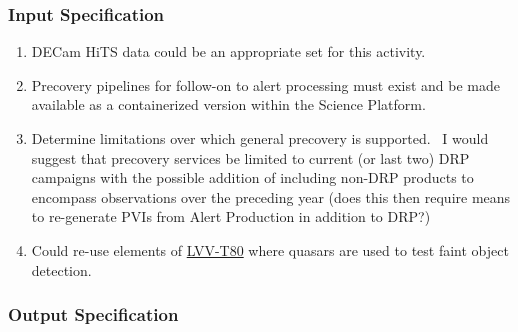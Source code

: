 \subsubsection{Input Specification}
\begin{enumerate}
\tightlist
\item
  DECam HiTS data could be an appropriate set for this activity.
\item
  Precovery pipelines for follow-on to alert processing must exist and
  be made available as a containerized version within the Science
  Platform.
\item
  Determine limitations over which general precovery is supported. ~I
  would suggest that precovery services be limited to current (or last
  two) DRP campaigns with the possible addition of including non-DRP
  products to encompass observations over the preceding year (does this
  then require means to re-generate PVIs from Alert Production in
  addition to DRP?)
\item
  Could re-use elements of
  \href{https://jira.lsstcorp.org/secure/Tests.jspa\#/testCase/LVV-T80}{LVV-T80}
  where quasars are used to test faint object detection.
\end{enumerate}


\subsubsection{Output Specification}

